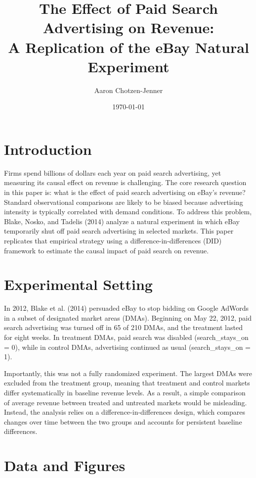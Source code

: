 \documentclass[12pt]{article}
\title{The Effect of Paid Search Advertising on Revenue: \\
A Replication of the eBay Natural Experiment}
\author{Aaron Chotzen-Jenner}
\date{\today}
\begin{document}
\maketitle

\section{Introduction}

Firms spend billions of dollars each year on paid search advertising, yet measuring its causal effect on revenue is challenging. The core research question in this paper is: what is the effect of paid search advertising on eBay's revenue? Standard observational comparisons are likely to be biased because advertising intensity is typically correlated with demand conditions. To address this problem, Blake, Nosko, and Tadelis (2014) analyze a natural experiment in which eBay temporarily shut off paid search advertising in selected markets. This paper replicates that empirical strategy using a difference-in-differences (DID) framework to estimate the causal impact of paid search on revenue.

\section{Experimental Setting}

In 2012, Blake et al. (2014) persuaded eBay to stop bidding on Google AdWords in a subset of designated market areas (DMAs). Beginning on May 22, 2012, paid search advertising was turned off in 65 of 210 DMAs, and the treatment lasted for eight weeks. In treatment DMAs, paid search was disabled (search\_stays\_on = 0), while in control DMAs, advertising continued as usual (search\_stays\_on = 1).

Importantly, this was not a fully randomized experiment. The largest DMAs were excluded from the treatment group, meaning that treatment and control markets differ systematically in baseline revenue levels. As a result, a simple comparison of average revenue between treated and untreated markets would be misleading. Instead, the analysis relies on a difference-in-differences design, which compares changes over time between the two groups and accounts for persistent baseline differences.

\section{Data and Figures}
\end{document}
